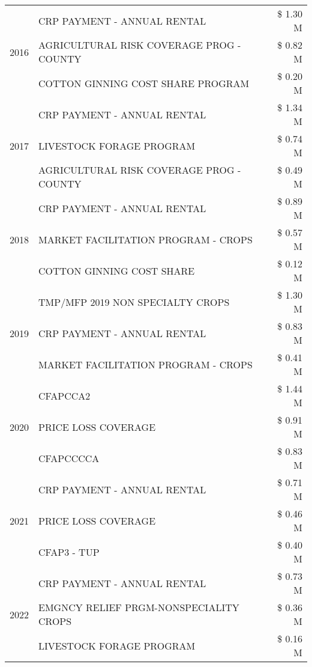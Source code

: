 \begin{tabular}{llr}
\cline{1-3}
\multirow[t]{3}{*}{2016} & CRP PAYMENT - ANNUAL RENTAL & \$ 1.30 M \\
 & AGRICULTURAL RISK COVERAGE PROG - COUNTY & \$ 0.82 M \\
 & COTTON GINNING COST SHARE PROGRAM & \$ 0.20 M \\
\cline{1-3}
\multirow[t]{3}{*}{2017} & CRP PAYMENT - ANNUAL RENTAL & \$ 1.34 M \\
 & LIVESTOCK FORAGE PROGRAM & \$ 0.74 M \\
 & AGRICULTURAL RISK COVERAGE PROG - COUNTY & \$ 0.49 M \\
\cline{1-3}
\multirow[t]{3}{*}{2018} & CRP PAYMENT - ANNUAL RENTAL & \$ 0.89 M \\
 & MARKET FACILITATION PROGRAM - CROPS & \$ 0.57 M \\
 & COTTON GINNING COST SHARE & \$ 0.12 M \\
\cline{1-3}
\multirow[t]{3}{*}{2019} & TMP/MFP 2019 NON SPECIALTY CROPS & \$ 1.30 M \\
 & CRP PAYMENT - ANNUAL RENTAL & \$ 0.83 M \\
 & MARKET FACILITATION PROGRAM - CROPS & \$ 0.41 M \\
\cline{1-3}
\multirow[t]{3}{*}{2020} & CFAPCCA2 & \$ 1.44 M \\
 & PRICE LOSS COVERAGE & \$ 0.91 M \\
 & CFAPCCCCA & \$ 0.83 M \\
\cline{1-3}
\multirow[t]{3}{*}{2021} & CRP PAYMENT - ANNUAL RENTAL & \$ 0.71 M \\
 & PRICE LOSS COVERAGE & \$ 0.46 M \\
 & CFAP3 - TUP & \$ 0.40 M \\
\cline{1-3}
\multirow[t]{3}{*}{2022} & CRP PAYMENT - ANNUAL RENTAL & \$ 0.73 M \\
 & EMGNCY RELIEF PRGM-NONSPECIALITY CROPS & \$ 0.36 M \\
 & LIVESTOCK FORAGE PROGRAM & \$ 0.16 M \\
\cline{1-3}
\bottomrule
\end{tabular}

